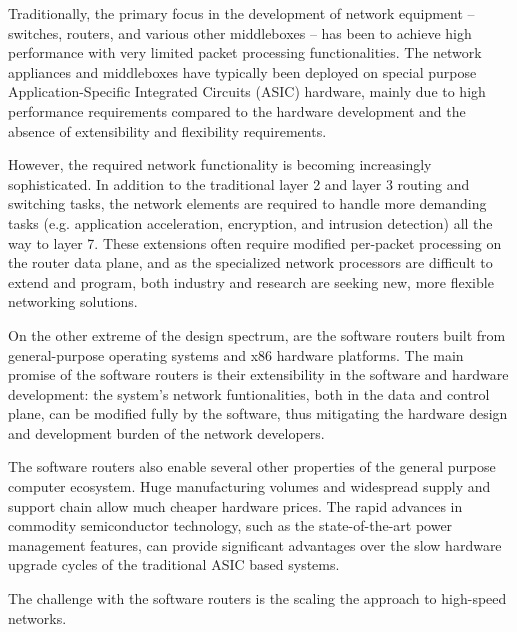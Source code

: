 
Traditionally, the primary focus in the development of network equipment -- switches, routers, and various other middleboxes -- has been to achieve high performance with very limited packet processing functionalities. The network appliances and middleboxes have typically been deployed on special purpose Application-Specific Integrated Circuits (ASIC) hardware, mainly due to high performance requirements compared to the hardware development and the absence of extensibility and flexibility requirements.~\cite{Dobrescu:2009:REP}

However, the required network functionality is becoming increasingly sophisticated. In addition to the traditional layer 2 and layer 3 routing and switching tasks, the network elements are required to handle more demanding tasks (e.g. application acceleration, encryption, and intrusion detection) all the way to layer 7. These extensions often require modified per-packet processing on the router data plane, and as the specialized network processors are difficult to extend and program, both industry and research are seeking new, more flexible networking solutions.~\cite{Egi:2009:PP, Dobrescu:2009:REP}

On the other extreme of the design spectrum, are the software routers built from general-purpose operating systems and x86 hardware platforms. The main promise of the software routers is their extensibility in the software and hardware development: the system's network funtionalities, both in the data and control plane, can be modified fully by the software, thus mitigating the hardware design and development burden of the network developers.~\cite{Dobrescu:2009:REP}

The software routers also enable several other properties of the general purpose computer ecosystem. Huge manufacturing volumes and widespread supply and support chain allow much cheaper hardware prices. The rapid advances in commodity semiconductor technology, such as the state-of-the-art power management features, can provide significant advantages over the slow hardware upgrade cycles of the traditional ASIC based systems.~\cite{Dobrescu:2009:REP}

The challenge with the software routers is the scaling the approach to high-speed networks.

